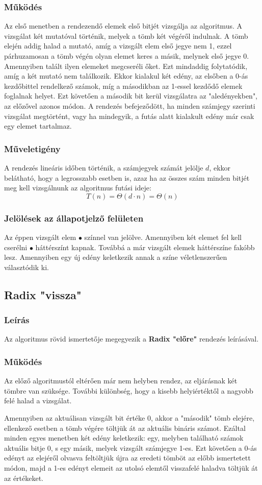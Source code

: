 \documentclass{elteikthesis}
\begin{document}
\subsubsection{Működés}
Az első menetben a rendezendő elemek első bitjét vizsgálja az algoritmus. A vizsgálat két mutatóval történik, melyek a tömb két végéről indulnak. A tömb elején addig halad a mutató, amíg a vizsgált elem első jegye nem 1, ezzel párhuzamosan a tömb végén olyan elemet keres a másik, melynek első jegye 0. Amennyiben talált ilyen elemeket megcseréli őket. Ezt mindaddig folytatódik, amíg a két mutató nem találkozik. Ekkor kialakul két edény, az elsőben a 0-ás kezdőbittel rendelkező számok, míg a másodikban az 1-essel kezdődő elemek foglalnak helyet. Ezt követően a második bit kerül vizsgálatra az "aledényekben", az előzővel azonos módon. A rendezés befejeződött, ha minden számjegy szerinti vizsgálat megtörtént, vagy ha mindegyik, a futás alatt kialakult edény már csak egy elemet tartalmaz.
\subsubsection{Műveletigény}
A rendezés lineáris időben történik, a számjegyek számát jelölje $d$, ekkor belátható, hogy a legrosszabb esetben is, azaz ha az összes szám minden bitjét meg kell vizsgálnunk az algoritmus futási ideje:
$$T(n)=\Theta(d \cdot n) = \Theta(n)$$
\subsubsection{Jelölések az állapotjelző felületen}
Az éppen vizsgált elem \textcolor{select}{\Huge$\bullet$} színnel van jelölve. Amennyiben két elemet fel kell cserélni \textcolor{swap}{\Huge$\bullet$} háttérszínt kapnak. Továbbá a már vizsgált elemek háttérszíne fakóbb lesz. Amennyiben egy új edény keletkezik annak a színe véletlenszerűen választódik ki.

\subsection{Radix "vissza"}
\subsubsection{Leírás}
Az algoritmus rövid ismertetője megegyezik a \textbf{Radix "előre"} rendezés leírásával.
\subsubsection{Működés}
Az előző algoritmustól eltérően már nem helyben rendez, az eljárásnak két tömbre van szüksége. További különbség, hogy a kisebb helyiértéktől a nagyobb felé halad a vizsgálat.\par Amennyiben az aktuálisan vizsgált bit értéke 0, akkor a "második" tömb elejére, ellenkező esetben a tömb végére töltjük át az aktuális bináris számot. Ezáltal minden egyes menetben két edény keletkezik: egy, melyben található számok aktuális bitje 0, s egy másik, melyek vizsgált számjegye 1-es. Ezt követően a 0-ás edényt az elejéről olvasva feltöltjük újra az eredeti tömböt az előbb ismertetett módon, majd a 1-es edényt elemeit az utolsó elemtől visszafelé haladva töltjük át az értékeket.
\end{document}
